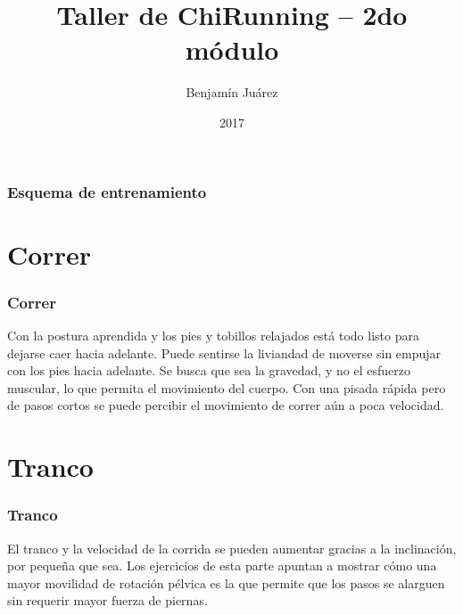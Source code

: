 \documentclass{beamer}
\title[Taller CR]{Taller de ChiRunning – 2do módulo} %
\author{Benjamín Juárez} %
\institute[Instructor certificado] %
{%
Instructor certificado de ChiRunning \\%
\medskip
\textit{cr.southamerica@gmail.com} %
}
\date{2017%
} %
\begin{document}
\begin{frame}
\titlepage %
\end{frame}

\begin{frame}
\frametitle{Esquema de entrenamiento} %
\tableofcontents %
\end{frame}


\section{Correr} 

\begin{frame}
\frametitle{Correr}
Con la postura aprendida y los pies y tobillos relajados está 
 todo listo para dejarse caer hacia adelante. Puede sentirse la
 liviandad de moverse sin empujar con los pies hacia adelante.
 Se busca que sea la gravedad, y no el esfuerzo muscular, lo
 que permita el movimiento del cuerpo. Con una pisada
 rápida pero de pasos cortos se puede percibir el movimiento
 de correr aún a poca velocidad.
\end{frame}

\section{Tranco}

\begin{frame}
\frametitle{Tranco}
El tranco y la velocidad de la corrida se pueden aumentar
 gracias a la inclinación, por pequeña que sea. Los ejercicios
 de esta parte apuntan a mostrar cómo una mayor movilidad
 de rotación pélvica es la que permite que los pasos se
 alarguen sin requerir mayor fuerza de piernas.
\end{frame}
\end{document}

